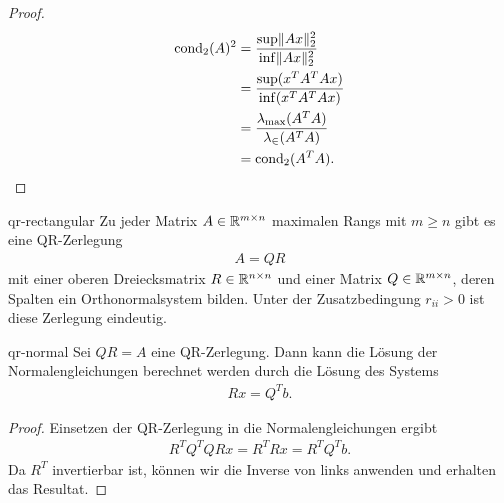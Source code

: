 \begin{proof}
  \begin{align}
    \operatorname{cond}_2(A)^2  &= \frac{\sup\lVert Ax\rVert_2^2}{\inf\lVert Ax\rVert_2^2}\\
                  &= \frac{\sup(x^TA^TAx)}{\inf(x^TA^TAx)}\\
                  &= \frac{\lambda_{\max}(A^TA)}{\lambda_{\in}(A^TA)}\\
                  &= \operatorname{cond}_2(A^TA).
  \end{align}
\end{proof}


\begin{Lemma}{qr-rectangular}
  Zu jeder Matrix $A\in \mathbb R^{m\times n}$ maximalen Rangs mit $m\ge n$
  gibt es eine QR-Zerlegung
  \begin{gather}
  A = QR
  \end{gather}
  mit einer oberen Dreiecksmatrix $R\in\mathbb R^{n\times n}$ und einer Matrix $Q\in\mathbb R^{m\times n}$, deren Spalten ein Orthonormalsystem bilden.
  Unter der Zusatzbedingung $r_{ii}>0$ ist
  diese Zerlegung eindeutig.
\end{Lemma}

\begin{Satz}{qr-normal}
  Sei $QR=A$ eine QR-Zerlegung. Dann kann die Lösung der Normalengleichungen berechnet werden durch die Lösung des Systems
  \begin{gather}
    Rx = Q^Tb.
  \end{gather}
\end{Satz}

\begin{proof}
  Einsetzen der QR-Zerlegung in die Normalengleichungen ergibt
  \begin{gather}
  R^TQ^TQR x = R^T R x = R^TQ^T b.
  \end{gather}
  Da $R^T$ invertierbar ist, können wir die Inverse von links anwenden und erhalten das Resultat.
\end{proof}

